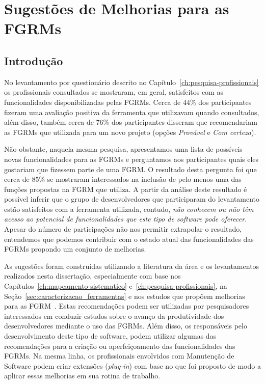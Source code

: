 \chapter{Sugestões de Melhorias para as FGRMs}\label{ch:sug_melhoria}

\section{Introdução}\label{sec:sug_melhoria_intro}

No levantamento por questionário descrito no
Capítulo~\ref{ch:pesquisa-profissionais} os profissionais consultados se
mostraram, em geral, satisfeitos com as funcionalidades disponibilizadas pelas
FGRMs. Cerca de 44\% dos par\-ti\-ci\-pan\-tes fizeram uma avaliação positiva
da ferramenta que utilizavam quando consultados, além disso, também cerca de
76\% dos participantes disseram que recomendariam as FGRMs que utilizada para
um novo projeto (opções \textit{Provável} e \textit{Com certeza}).

Não obstante, naquela mesma pesquisa, apresentamos uma lista de possíveis novas
funcionalidades para as FGRMs e perguntamos aos participantes quais eles
gostariam que fizessem parte de uma FGRM\@. O resultado desta pergunta foi que
cerca de 85\% se mostraram interessados na inclusão de pelo menos uma das
funções propostas na FGRM que utiliza. A partir da análise deste resultado é
possível inferir que o grupo de desenvolvedores que participaram do
levantamento estão satisfeitos com a ferramenta utilizada, contudo, \textit{não
    conhecem ou não têm acesso ao potencial de funcionalidades que este tipo de
    software pode oferecer}. Apesar do número de participações não nos permitir
extrapolar o resultado, entendemos que podemos contribuir com o estado
a\-tu\-al das funcionalidades das FGRMs propondo um conjunto de melhorias.

As sugestões foram construídas utilizando a literatura da área e os
levantamentos realizados nesta dissertação, especialmente com base nos
Capítulos~\ref{ch:mapeamento-sistematico} e~\ref{ch:pesquisa-profissionais}, na
Seção~\ref{sec:caracterizacao_ferramentas} e nos estudos que propõem melhorias
para as FGRM~\cite{zimmermann2009improving, zimmermann2010makes, singh2011bug}.
Estas recomendações podem ser utilizadas por pesquisadores interessados em
conduzir estudos sobre o avanço da produtividade dos desenvolvedores mediante o
uso das FGRMs. Além disso, os responsáveis pelo desenvolvimento deste tipo de
software, podem utilizar algumas das recomendações para a criação ou
aperfeiçoamento das funcionalidades das FGRMs. Na mesma linha, os profissionais
envolvidos com Manutenção de Software podem criar extensões (\textit{plug-in})
com base no que foi proposto de modo a aplicar essas melhorias em sua rotina de
trabalho.

